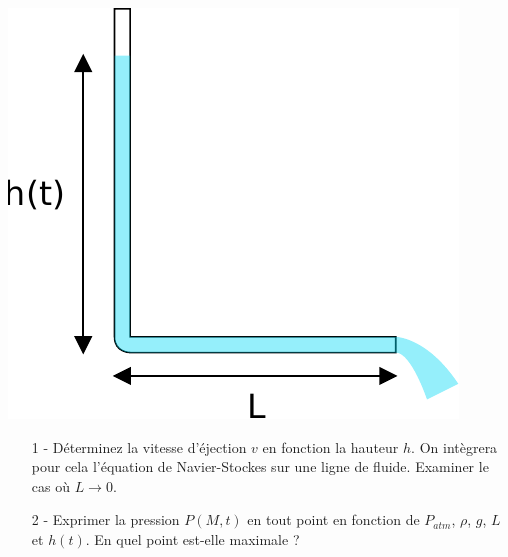 \documentclass{report}
\begin{document}
\begin{center}
	\includegraphics[scale=0.5]{meca_flu4.pdf}
\end{center}

\begin{itemize}

\item[1 - ] Déterminez la vitesse d'éjection $v$ en fonction la hauteur $h$. On intègrera pour cela l'équation de Navier-Stockes sur une ligne de fluide. Examiner le cas où $L\longrightarrow0$.

\item[2 - ] Exprimer la pression $P(M,t)$ en tout point en fonction de $P_{atm}$, $\rho$, $g$, $L$ et $h(t)$. En quel point est-elle maximale ?

\end{itemize}
\end{document}

